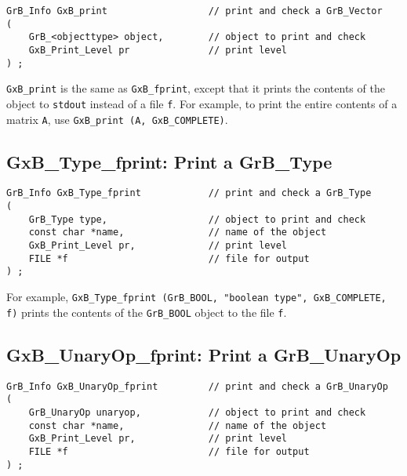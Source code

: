 \documentclass[12pt]{article}
\begin{document}
\begin{mdframed}[userdefinedwidth=6in]
{\footnotesize
\begin{verbatim}
GrB_Info GxB_print                  // print and check a GrB_Vector
(
    GrB_<objecttype> object,        // object to print and check
    GxB_Print_Level pr              // print level
) ;
\end{verbatim} } \end{mdframed}

\verb'GxB_print' is the same as \verb'GxB_fprint', except that it prints the
contents of the object to \verb'stdout' instead of a file \verb'f'.  For
example, to print the entire contents of a matrix \verb'A',  use
\verb'GxB_print (A, GxB_COMPLETE)'.

\subsection{{\sf GxB\_Type\_fprint:} Print a {\sf GrB\_Type}}

\begin{mdframed}[userdefinedwidth=6in]
{\footnotesize
\begin{verbatim}
GrB_Info GxB_Type_fprint            // print and check a GrB_Type
(
    GrB_Type type,                  // object to print and check
    const char *name,               // name of the object
    GxB_Print_Level pr,             // print level
    FILE *f                         // file for output
) ;
\end{verbatim} } \end{mdframed}

For example, \verb'GxB_Type_fprint (GrB_BOOL, "boolean type", GxB_COMPLETE, f)'
prints the contents of the \verb'GrB_BOOL' object to the file \verb'f'.

\newpage
\subsection{{\sf GxB\_UnaryOp\_fprint:} Print a {\sf GrB\_UnaryOp}}

\begin{mdframed}[userdefinedwidth=6in]
{\footnotesize
\begin{verbatim}
GrB_Info GxB_UnaryOp_fprint         // print and check a GrB_UnaryOp
(
    GrB_UnaryOp unaryop,            // object to print and check
    const char *name,               // name of the object
    GxB_Print_Level pr,             // print level
    FILE *f                         // file for output
) ;
\end{verbatim} } \end{mdframed}
\end{document}
